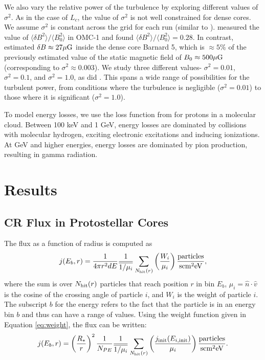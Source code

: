\documentclass[twocolumn]{aastex63}
\def\lp{\left(}
\def\rp{\right)}
\begin{document}
We also vary the relative power of the turbulence by exploring different values of $\sigma^2$. As in the case of $L_c$, the value of $\sigma^2$ is not well constrained for dense cores. We assume $\sigma^2$ is constant across the grid for each run (similar to \cite{fraschetti_2018_mottled}). \cite{houde_2009_bfields} measured the value of $\langle\delta B^2\rangle/\langle B_0^2\rangle$ in OMC-1 and found $\langle\delta B^2\rangle/\langle B_0^2\rangle=0.28$. In contrast, \cite{pineda_2020_turbulence} estimated $\delta B \approx 27 \mu \rm G$ inside the dense core Barnard 5, which is $\approx 5 \%$ of the previously estimated value of the static magnetic field of $B_0 \approx 500 \mu \rm G$ (corresponding to $\sigma^2 \approx 0.003$). We study three different values- $\sigma^2=0.01$, $\sigma^2=0.1$, and $\sigma^2=1.0$, as did \cite{fraschetti_2018_mottled}. This spans a wide range of possibilities for the turbulent power, from conditions where the turbulence is negligible ($\sigma^2=0.01$) to those where it is significant ($\sigma^2=1.0$). 

To model energy losses, we use the loss function from \cite{padovani_2009_cosmic} for protons in a molecular cloud. Between 100 keV and 1 GeV, energy losses are dominated by collisions with molecular hydrogen, exciting electronic excitations and inducing ionizations. At GeV and higher energies, energy losses are dominated by pion production, resulting in gamma radiation. 

\section{Results}
\label{section:results}

\subsection{CR Flux in Protostellar Cores}
\label{subsection:crflux}

The flux as a function of radius is computed as 
\begin{equation}
j(E_b, r)= \frac{1}{4\pi r^2 dE} \frac{1}{\overline{1/\mu_i}}\sum_{N_{\rm hit}(r)} \lp\frac{W_i}{\mu_i}\rp  \frac{\rm particles} {\rm s cm^2 eV},
\end{equation}
where the sum is over $N_{\rm hit} (r)$ particles that reach position $r$ in bin $E_b$, $\mu_i=\hat{n}\cdot \hat{v}$ is the cosine of the crossing angle of particle $i$, and $W_i$ is the weight of particle $i$. The subscript $b$ for the energy refers to the fact that the particle is in an energy bin $b$ and thus can have a range of values. Using the weight function given in Equation \ref{eq:weight}, the flux can be written:
\begin{equation}
\label{eq:radial_flux}
j(E_b, r)=\lp\frac{R_*}{r}\rp^2 \frac{1}{N_{PE}} \frac{1}{\overline{1/\mu_i}} \sum_{N_{\rm hit} (r)} \lp\frac{j_{\rm init}(E_{i,\rm init})}{\mu_i}\rp  \frac{\rm particles} {\rm s cm^2 eV}.
\end{equation}
\end{document}
